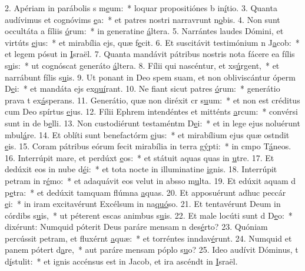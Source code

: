 2. Apériam in parábolis s m\uline{e}um:~* loquar propositiónes b in\uline{í}tio.
3. Quanta audívimus et cognóvims \uline{e}a:~* et patres nostri narravrunt n\uline{o}bis.
4. Non sunt occultáta a fíliis \uline{ó}rum:~* in generatine \uline{á}ltera.
5. Narrántes laudes Dómini, et virtúts \uline{e}jus:~* et mirabília ejs, quæ f\uline{e}cit.
6. Et suscitávit testimónium n J\uline{a}cob:~* et legem pósut in \uline{I}sraël.
7. Quanta mandávit pátribus nostris nota fácere ea fílis s\uline{u}is:~* ut cognóscat generáto \uline{á}ltera.
8. Fílii qui nascéntur, et xs\uline{ú}rgent,~* et narrábunt fílis s\uline{u}is.
9. Ut ponant in Deo spem suam, et non obliviscántur óperm D\uline{e}i:~* et mandáta ejs ex\uline{quí}rant.
10. Ne fiant sicut patres \uline{ó}rum:~* generátio prava t ex\uline{á}sperans.
11. Generátio, quæ non diréxit cr s\uline{u}um:~* et non est créditus cum Deo spírtus \uline{e}jus.
12. Fílii Ephrem intendéntes et mitténts \uline{a}rcum:~* convérsi sunt in de b\uline{e}lli.
13. Non custodiérunt testaméntm D\uline{e}i:~* et in lege ejus noluérunt mbul\uline{á}re.
14. Et oblíti sunt benefactórm \uline{e}jus:~* et mirabílium ejus quæ ostndit \uline{e}is.
15. Coram pátribus eórum fecit mirabília in terra g\uline{ý}pti:~* in cmpo T\uline{á}neos.
16. Interrúpit mare, et perdúxt \uline{e}os:~* et státuit aquas quas in \uline{u}tre.
17. Et dedúxit eos in nube d\uline{é}i:~* et tota nocte in illuminatine \uline{i}gnis.
18. Interrúpit petram in r\uline{é}mo:~* et adaquávit eos velut in absso m\uline{u}lta.
19. Et edúxit aquam d p\uline{e}tra:~* et dedúxit tamquam flúmna \uline{a}quas.
20. Et apposuérunt adhuc peccár \uline{e}i:~* in iram excitavérunt Excélsum in na\uline{quó}so.
21. Et tentavérunt Deum in córdibs s\uline{u}is,~* ut péterent escas animbus s\uline{u}is.
22. Et male locúti sunt d D\uline{e}o:~* dixérunt: Numquid póterit Deus paráre mensam n des\uline{é}rto?
23. Quóniam percússit petram, et fluxérnt \uline{a}quæ:~* et torréntes inndav\uline{é}runt.
24. Numquid et panem pótert d\uline{a}re,~* aut paráre mensam póplo s\uline{u}o?
25. Ideo audívit Dóminus, t d\uline{í}stulit:~* et ignis accénsus est in Jacob, et ira ascéndt in \uline{I}sraël.
